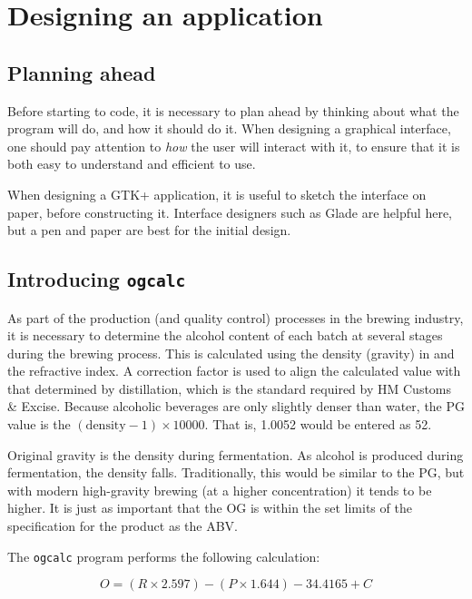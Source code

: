 \documentclass[a4paper,oneside]{article}
\newcommand{\program}[1]{\texttt{#1}}
\begin{document}
\section{Designing an application}

\subsection{Planning ahead}

Before starting to code, it is necessary to plan ahead by thinking
about what the program will do, and how it should do it.  When
designing a graphical interface, one should pay attention to
\emph{how} the user will interact with it, to ensure that it is both
easy to understand and efficient to use.

When designing a GTK+ application, it is useful to sketch the
interface on paper, before constructing it.  Interface designers such
as Glade are helpful here, but a pen and paper are best for the
initial design.

\subsection{Introducing \program{ogcalc}}

As part of the production (and quality control) processes in the
brewing industry, it is necessary to determine the alcohol content of
each batch at several stages during the brewing process.  This is
calculated using the density (gravity) in  and the
refractive index.  A correction factor is used to align the calculated
value with that determined by distillation, which is the standard
required by HM Customs \& Excise.  Because alcoholic beverages are
only slightly denser than water, the PG value is the
$(\mathrm{density} -1) \times 10000$.  That is, 1.0052 would be
entered as 52.

Original gravity is the density during fermentation.  As alcohol is
produced during fermentation, the density falls.  Traditionally, this
would be similar to the PG, but with modern high-gravity brewing (at a
higher concentration) it tends to be higher.  It is just as important
that the OG is within the set limits of the specification for the
product as the ABV.


The \program{ogcalc} program performs the following calculation:

\begin{equation}
O = (R \times 2.597) - (P \times 1.644) - 34.4165 + C
\end{equation}
\end{document}
